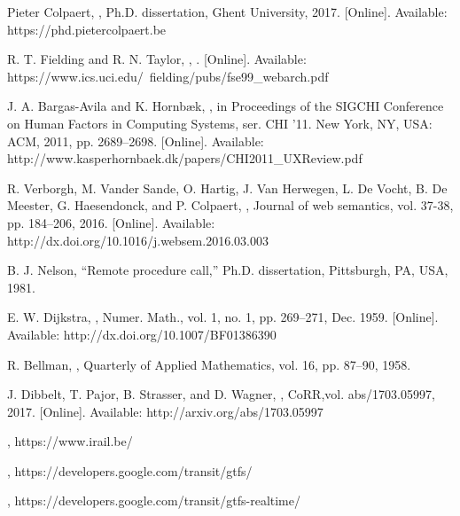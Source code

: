 \documentclass[twocolumn]{phdsymp} %
\begin{document}
%
\begin{thebibliography}{1}
Pieter Colpaert,
,
\newblock Ph.D. dissertation, Ghent University, 2017. [Online]. Available: https://phd.pietercolpaert.be

R. T. Fielding and R. N. Taylor, 
,
. [Online]. Available: https://www.ics.uci.edu/~fielding/pubs/fse99\_webarch.pdf

J. A. Bargas-Avila and K. Hornbæk, 
,
in Proceedings of the SIGCHI Conference on Human Factors in Computing Systems, ser. CHI ’11. New York, NY, USA: ACM, 2011, pp. 2689–2698. [Online]. Available: http://www.kasperhornbaek.dk/papers/CHI2011\_UXReview.pdf

R. Verborgh, M. Vander Sande, O. Hartig, J. Van Herwegen, L. De Vocht, B. De Meester, G. Haesendonck, and P. Colpaert, 
,
\newblock Journal of web semantics, vol. 37-38, pp. 184–206, 2016. [Online]. Available: http://dx.doi.org/10.1016/j.websem.2016.03.003

B. J. Nelson, “Remote procedure call,” Ph.D. dissertation, Pittsburgh, PA, USA, 1981.

E. W. Dijkstra, 
,
\newblock Numer. Math., vol. 1, no. 1, pp. 269–271, Dec. 1959. [Online]. Available: http://dx.doi.org/10.1007/BF01386390

R. Bellman,
,
\newblock Quarterly of Applied Mathematics, vol. 16, pp. 87–90, 1958.

J. Dibbelt, T. Pajor, B. Strasser, and D. Wagner,
,
\newblock CoRR,vol. abs/1703.05997, 2017. [Online]. Available: http://arxiv.org/abs/1703.05997

,
\newblock https://www.irail.be/

,
\newblock https://developers.google.com/transit/gtfs/

,
\newblock https://developers.google.com/transit/gtfs-realtime/
\end{thebibliography}
%
\end{document}
